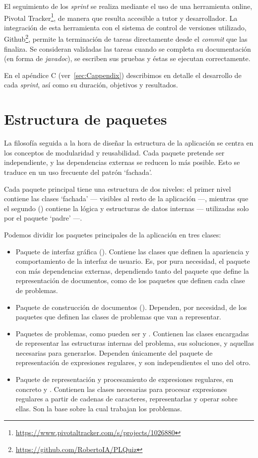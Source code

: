 El seguimiento de los \emph{sprint} se realiza mediante el uso de una herramienta online, Pivotal Tracker\footnote{\url{https://www.pivotaltracker.com/s/projects/1026880}}, de manera que resulta accesible a tutor y desarrollador.
La integración de esta herramienta con el sistema de control de versiones utilizado, Github\footnote{\url{https://github.com/RobertoIA/PLQuiz}}, permite la terminación de tareas directamente desde el \emph{commit} que las finaliza.
Se consideran validadas las tareas cuando se completa su documentación (en forma de \emph{javadoc}), se escriben sus pruebas y éstas se ejecutan correctamente.

En el apéndice C (ver~\ref{sec:Cappendix}) describimos en detalle el desarrollo de cada \emph{sprint}, así como su duración, objetivos y resultados.

\section{Estructura de paquetes}
La filosofía seguida a la hora de diseñar la estructura de la aplicación se centra en los conceptos de modularidad y reusabilidad.
Cada paquete pretende ser independiente, y las dependencias externas se reducen lo más posible.
Esto se traduce en un uso frecuente del patrón `fachada'.

Cada paquete principal tiene una estructura de dos niveles: el primer nivel contiene las clases `fachada' --- visibles al resto de la aplicación ---, mientras que el segundo () contiene la lógica y estructuras de datos internas --- utilizadas solo por el paquete `padre' ---.

Podemos dividir los paquetes principales de la aplicación en tres clases:
\begin{itemize}
	\item Paquete de interfaz gráfica ().
	Contiene las clases que definen la apariencia y comportamiento de la interfaz de usuario.
	Es, por pura necesidad, el paquete con más dependencias externas, dependiendo tanto del paquete que define la representación de documentos, como de los paquetes que definen cada clase de problemas.
	\item Paquete de construcción de documentos ().
	Dependen, por necesidad, de los paquetes que definen las clases de problemas que van a representar.
	\item Paquetes de problemas, como pueden ser  y .
	Contienen las clases encargadas de representar las estructuras internas del problema, sus soluciones, y aquellas necesarias para generarlos.
	Dependen únicamente del paquete de representación de expresiones regulares, y son independientes el uno del otro.
	\item Paquete de representación y procesamiento de expresiones regulares, en concreto  y .
	Contienen las clases necesarias para procesar expresiones regulares a partir de cadenas de caracteres, representarlas y operar sobre ellas.
	Son la base sobre la cual trabajan los problemas.
\end{itemize}

